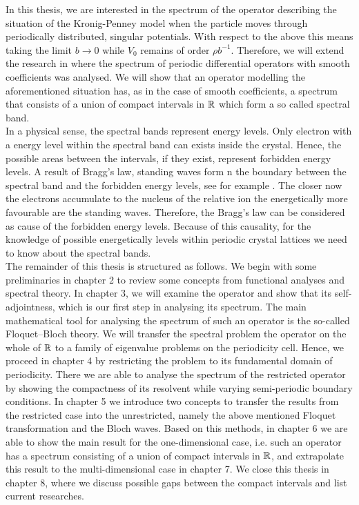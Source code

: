 In this thesis, we are interested in the spectrum of the operator describing the situation of the Kronig-Penney model when the particle moves through periodically distributed, singular potentials. With respect to the above this means taking the limit $b \rightarrow 0$ while $V_{0}$ remains of order $\rho b^{-1}$. Therefore, we will extend the research in \cite{dorfler2011photonic} where the spectrum of periodic differential operators with smooth coefficients was analysed. We will show that an operator modelling the aforementioned situation has, as in the case of smooth coefficients, a spectrum that consists of a union of compact intervals in $\mathbb{R}$ which form a so called spectral band. 
~\\
In a physical sense, the spectral bands represent energy levels. Only electron with a energy level within the spectral band can exists inside the crystal. Hence, the possible areas between the intervals, if they exist, represent forbidden energy levels. A result of Bragg's law, standing waves form n the boundary between the spectral band and the forbidden energy levels, see for example \cite[section 3.2]{heering2002elektrophysik}. The closer now the electrons accumulate to the nucleus of the relative ion the energetically more favourable are the standing waves. Therefore, the Bragg's law can be considered as cause of the forbidden energy levels. Because of this causality, for the knowledge of possible energetically levels within periodic crystal lattices we need to know about the spectral bands.
~\\

The remainder of this thesis is structured as follows. We begin with some preliminaries in chapter 2 to review some concepts from functional analyses and spectral theory. In chapter 3, we will examine the operator and show that its self-adjointness, which is our first step in analysing its spectrum. The main mathematical tool for analysing the spectrum of such an operator is the so-called Floquet–Bloch theory. We will transfer the spectral problem the operator on the whole of $\mathbb{R}$ to a family of eigenvalue problems on the periodicity cell. Hence, we proceed in chapter 4 by restricting the problem to its fundamental domain of periodicity. There we are able to analyse the spectrum of the restricted operator by showing the compactness of its resolvent while varying  semi-periodic boundary conditions. In chapter 5 we introduce two concepts to transfer the results from the restricted case into the unrestricted, namely the above mentioned Floquet transformation and the Bloch waves. Based on this methods, in chapter 6 we are able to show the main result for the one-dimensional case, i.e. such an operator has a spectrum consisting of a union of compact intervals in $\mathbb{R}$, and extrapolate this result to the multi-dimensional case in chapter 7. We close this thesis in chapter 8, where we discuss possible gaps between the compact intervals and list current researches.